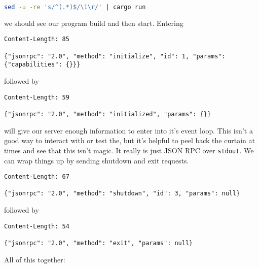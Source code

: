 \begin{lstlisting}[language=bash]
    sed -u -re 's/^(.*)$/\1\r/' | cargo run
\end{lstlisting}

we should see our program build and then start. Entering

\begin{lstlisting}
Content-Length: 85

{"jsonrpc": "2.0", "method": "initialize", "id": 1, "params": {"capabilities": {}}}
\end{lstlisting}

followed by

\begin{lstlisting}
Content-Length: 59

{"jsonrpc": "2.0", "method": "initialized", "params": {}}
\end{lstlisting}

will give our server enough information to enter into it's event loop. This isn't a good way to interact with or test the, but it's helpful to peel back the curtain at times and see that this isn't magic. It really is just JSON RPC over \texttt{stdout}. We can wrap things up by sending shutdown and exit requests.

\begin{lstlisting}
Content-Length: 67

{"jsonrpc": "2.0", "method": "shutdown", "id": 3, "params": null}
\end{lstlisting}

followed by

\begin{lstlisting}
Content-Length: 54

{"jsonrpc": "2.0", "method": "exit", "params": null}
\end{lstlisting}

All of this together:

